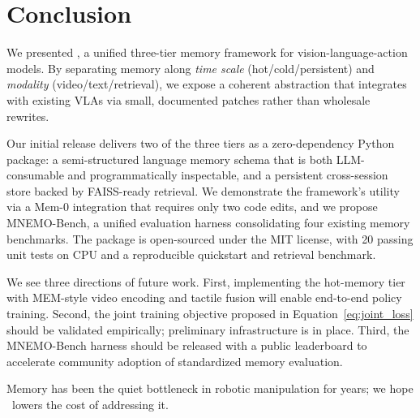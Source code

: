 \section{Conclusion}
\label{sec:conclusion}

We presented \method, a unified three-tier memory framework for
vision-language-action models. By separating memory along
\emph{time scale} (hot/cold/persistent) and \emph{modality}
(video/text/retrieval), we expose a coherent abstraction that
integrates with existing VLAs via small, documented patches rather
than wholesale rewrites.

Our initial release delivers two of the three tiers as a
zero-dependency Python package: a semi-structured language memory
schema that is both LLM-consumable and programmatically
inspectable, and a persistent cross-session store backed by
FAISS-ready retrieval. We demonstrate the framework's utility via
a Mem-0 integration that requires only two code edits, and we
propose MNEMO-Bench, a unified evaluation harness consolidating
four existing memory benchmarks. The package is open-sourced under
the MIT license, with 20 passing unit tests on CPU and a
reproducible quickstart and retrieval benchmark.

We see three directions of future work. First, implementing the
hot-memory tier with MEM-style video encoding and tactile fusion
will enable end-to-end policy training. Second, the joint training
objective proposed in Equation~\ref{eq:joint_loss} should be
validated empirically; preliminary infrastructure is in place.
Third, the MNEMO-Bench harness should be released with a public
leaderboard to accelerate community adoption of standardized memory
evaluation.

Memory has been the quiet bottleneck in robotic manipulation for
years; we hope \method\ lowers the cost of addressing it.
